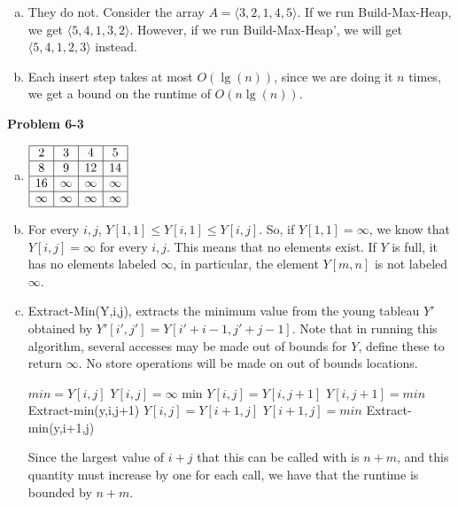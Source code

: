 \documentclass{article}
\begin{document}
\begin{enumerate}[a.]
\item
They do not. Consider the array $A =\langle 3,2,1,4,5\rangle$. If we run Build-Max-Heap, we get $\langle 5,4,1,3,2\rangle$. However, if we run Build-Max-Heap', we will get $\langle 5,4,1,2,3\rangle$ instead.
\item
Each insert step takes at most $O(\lg(n))$, since we are doing it $n$ times, we get a bound on the runtime of $O(n\lg(n))$.
\end{enumerate}
\noindent\textbf{Problem 6-3}\\
\begin{enumerate}[a.]
\item
$
\begin{array}{|c|c|c|c|}
\hline
2&3&4&5\\
\hline
8&9&12&14\\
\hline
16&\infty&\infty&\infty\\
\hline
\infty&\infty&\infty&\infty\\
\hline
\end{array}
$

\item
For every $i,j$, $Y[1,1] \le Y[i,1] \le Y[i,j]$. So, if $Y[1,1] = \infty$, we know that $Y[i,j]=\infty$ for every $i,j$. This means that no elements exist. If $Y$ is full, it has no elements labeled $\infty$, in particular, the element $Y[m,n]$ is not labeled $\infty$.
\item
Extract-Min(Y,i,j), extracts the minimum value from the young tableau $Y'$ obtained by $Y'[i',j'] = Y[i'+i-1,j'+j-1]$. Note that in running this algorithm, several accesses may be made out of bounds for $Y$, define these to return $\infty$. No store operations will be made on out of bounds locations.
\begin{algorithm}
\begin{algorithmic}[1]
\State $min = Y[i,j]$
\State $Y[i,j] = \infty$
\State \Return min
\EndIf
{}
\State $Y[i,j] = Y[i,j+1]$
\State $Y[i,j+1] = min$
\State \Return Extract-min(y,i,j+1)
\Else
\State $Y[i,j] = Y[i+1,j]$
\State $Y[i+1,j] = min$
\State \Return Extract-min(y,i+1,j)
\EndIf
\end{algorithmic}
\end{algorithm}
Since the largest value of $i+j$ that this can be called with is $n+m$, and this quantity must increase by one for each call, we have that the runtime is bounded by $n+m$.


\end{enumerate}
\end{document}
